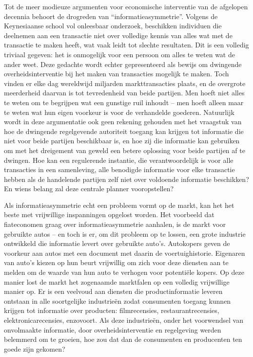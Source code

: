 Tot de meer modieuze argumenten voor economische interventie van de afgelopen decennia behoort de drogreden van ``informatieasymmetrie''. Volgens de Keynesiaanse school vol onleesbaar onderzoek, beschikken individuen die deelnemen aan een transactie niet over volledige kennis van alles wat met de transactie te maken heeft, wat vaak leidt tot slechte resultaten. Dit is een volledig triviaal gegeven: het is onmogelijk voor een persoon om alles te weten wat de ander weet. Deze gedachte wordt echter gepresenteerd als bewijs om dwingende overheidsinterventie bij het maken van transacties mogelijk te maken. Toch vinden er elke dag wereldwijd miljarden markttransacties plaats, en de overgrote meerderheid daarvan is tot tevredenheid van beide partijen. Men hoeft niet alles te weten om te begrijpen wat een gunstige ruil inhoudt -- men hoeft alleen maar te weten wat hun eigen voorkeur is voor de verhandelde goederen. Natuurlijk wordt in deze argumentatie ook geen rekening gehouden met het vraagstuk van hoe de dwingende regelgevende autoriteit toegang kan krijgen tot informatie die niet voor beide partijen beschikbaar is, en hoe zij die informatie kan gebruiken om met het dreigement van geweld een betere oplossing voor beide partijen af te dwingen. Hoe kan een regulerende instantie, die verantwoordelijk is voor alle transacties in een samenleving, alle benodigde informatie voor elke transactie hebben als de handelende partijen zelf niet over voldoende informatie beschikken? En wiens belang zal deze centrale planner vooropstellen?

Als informatieasymmetrie echt een probleem vormt op de markt, kan het het beste met vrijwillige inspanningen opgelost worden. Het voorbeeld dat fiateconomen graag over informatieasymmetrie aanhalen, is de markt voor gebruikte auto\textquotesingle s -- en toch is er, om dit probleem op te lossen, een grote industrie ontwikkeld die informatie levert over gebruikte auto's. Autokopers geven de voorkeur aan auto\textquotesingle s met een document met daarin de voertuighistorie. Eigenaren van auto's kiezen op hun beurt vrijwillig om zich voor deze diensten aan te melden om de waarde van hun auto te verhogen voor potentiële kopers. Op deze manier lost de markt het zogenaamde marktfalen op een volledig vrijwillige manier op. Er is een veelvoud aan diensten die productinformatie leveren ontstaan in alle soortgelijke industrieën zodat consumenten toegang kunnen krijgen tot informatie over producten: filmrecensies, restaurantrecensies, elektronicarecensies, enzovoort. Als deze industrieën, onder het voorwendsel van onvolmaakte informatie, door overheidsinterventie en regelgeving werden belemmerd om te groeien, hoe zou dat dan de consumenten en producenten ten goede zijn gekomen?

